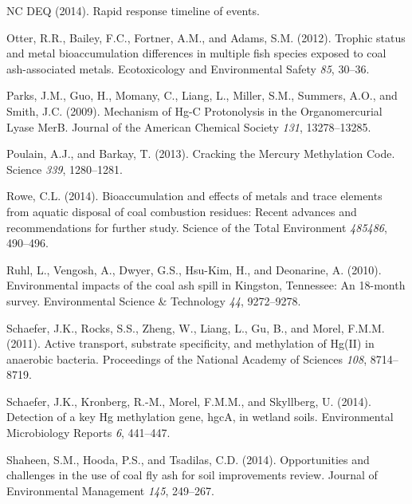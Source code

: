 \documentclass[ms]{uncgdissertationexp}
\theoremstyle{plain}
\theoremstyle{definition}
\theoremstyle{remark}
\begin{document}
  \hypertarget{ref-ncdeqRapidResponseTimeline2014}{}
  NC DEQ (2014). Rapid response timeline of events.
  
  \hypertarget{ref-otterTrophicStatusMetal2012}{}
  Otter, R.R., Bailey, F.C., Fortner, A.M., and Adams, S.M. (2012).
  Trophic status and metal bioaccumulation differences in multiple fish
  species exposed to coal ash-associated metals. Ecotoxicology and
  Environmental Safety \emph{85}, 30--36.
  
  \hypertarget{ref-parksMechanismHgProtonolysis2009}{}
  Parks, J.M., Guo, H., Momany, C., Liang, L., Miller, S.M., Summers,
  A.O., and Smith, J.C. (2009). Mechanism of Hg-C Protonolysis in the
  Organomercurial Lyase MerB. Journal of the American Chemical Society
  \emph{131}, 13278--13285.
  
  \hypertarget{ref-poulainCrackingMercuryMethylation2013}{}
  Poulain, A.J., and Barkay, T. (2013). Cracking the Mercury Methylation
  Code. Science \emph{339}, 1280--1281.
  
  \hypertarget{ref-roweBioaccumulationEffectsMetals2014}{}
  Rowe, C.L. (2014). Bioaccumulation and effects of metals and trace
  elements from aquatic disposal of coal combustion residues: Recent
  advances and recommendations for further study. Science of the Total
  Environment \emph{485486}, 490--496.
  
  \hypertarget{ref-ruhlEnvironmentalImpactsCoal2010}{}
  Ruhl, L., Vengosh, A., Dwyer, G.S., Hsu-Kim, H., and Deonarine, A.
  (2010). Environmental impacts of the coal ash spill in Kingston,
  Tennessee: An 18-month survey. Environmental Science \& Technology
  \emph{44}, 9272--9278.
  
  \hypertarget{ref-schaeferActiveTransportSubstrate2011}{}
  Schaefer, J.K., Rocks, S.S., Zheng, W., Liang, L., Gu, B., and Morel,
  F.M.M. (2011). Active transport, substrate specificity, and methylation
  of Hg(II) in anaerobic bacteria. Proceedings of the National Academy of
  Sciences \emph{108}, 8714--8719.
  
  \hypertarget{ref-schaeferDetectionKeyHg2014}{}
  Schaefer, J.K., Kronberg, R.-M., Morel, F.M.M., and Skyllberg, U.
  (2014). Detection of a key Hg methylation gene, hgcA, in wetland soils.
  Environmental Microbiology Reports \emph{6}, 441--447.
  
  \hypertarget{ref-shaheenOpportunitiesChallengesUse2014}{}
  Shaheen, S.M., Hooda, P.S., and Tsadilas, C.D. (2014). Opportunities and
  challenges in the use of coal fly ash for soil improvements review.
  Journal of Environmental Management \emph{145}, 249--267.
  
\end{document}
